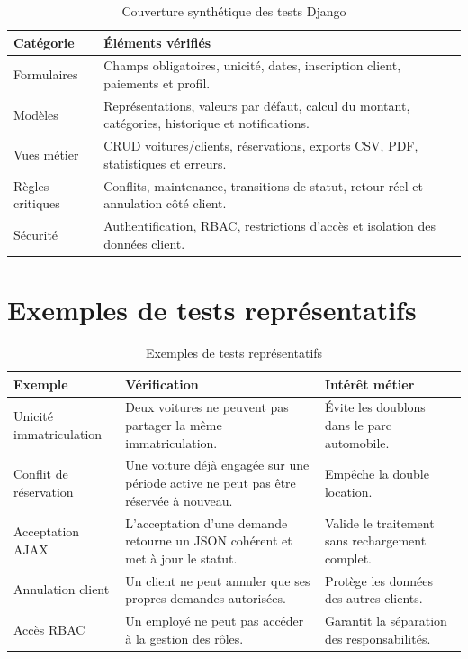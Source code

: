 \begin{table}[H]
\centering
\caption{Couverture synthétique des tests Django}
\begin{tabularx}{\textwidth}{|l|X|}
\hline
\textbf{Catégorie} & \textbf{Éléments vérifiés} \\
\hline
Formulaires & Champs obligatoires, unicité, dates, inscription client, paiements et profil. \\
\hline
Modèles & Représentations, valeurs par défaut, calcul du montant, catégories, historique et notifications. \\
\hline
Vues métier & CRUD voitures/clients, réservations, exports CSV, PDF, statistiques et erreurs. \\
\hline
Règles critiques & Conflits, maintenance, transitions de statut, retour réel et annulation côté client. \\
\hline
Sécurité & Authentification, RBAC, restrictions d'accès et isolation des données client. \\
\hline
\end{tabularx}
\end{table}

\section{Exemples de tests représentatifs}

\begin{table}[H]
\centering
\caption{Exemples de tests représentatifs}
\begin{tabularx}{\textwidth}{|p{3.5cm}|X|X|}
\hline
\textbf{Exemple} & \textbf{Vérification} & \textbf{Intérêt métier} \\
\hline
Unicité immatriculation & Deux voitures ne peuvent pas partager la même immatriculation. & Évite les doublons dans le parc automobile. \\
\hline
Conflit de réservation & Une voiture déjà engagée sur une période active ne peut pas être réservée à nouveau. & Empêche la double location. \\
\hline
Acceptation AJAX & L'acceptation d'une demande retourne un JSON cohérent et met à jour le statut. & Valide le traitement sans rechargement complet. \\
\hline
Annulation client & Un client ne peut annuler que ses propres demandes autorisées. & Protège les données des autres clients. \\
\hline
Accès RBAC & Un employé ne peut pas accéder à la gestion des rôles. & Garantit la séparation des responsabilités. \\
\hline
\end{tabularx}
\end{table}

